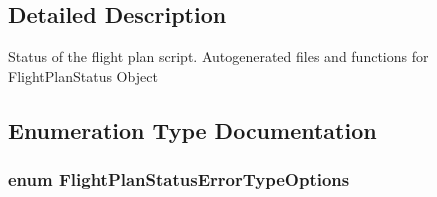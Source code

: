 \subsection{\-Detailed \-Description}
\-Status of the flight plan script. \-Autogenerated files and functions for \-Flight\-Plan\-Status \-Object 

\subsection{\-Enumeration \-Type \-Documentation}
\hypertarget{group___flight_plan_status_gae3cfd4d50b1d2bd805fa41f654fae5c0}{
\subsubsection[{\-Flight\-Plan\-Status\-Error\-Type\-Options}]{\setlength{\rightskip}{0pt plus 5cm}enum {\bf \-Flight\-Plan\-Status\-Error\-Type\-Options}}}\label{group___flight_plan_status_gae3cfd4d50b1d2bd805fa41f654fae5c0}
